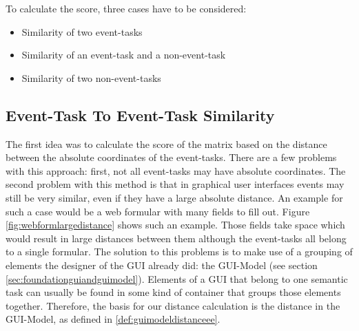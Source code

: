 To calculate the score, three cases have to be considered:
\begin{itemize}
	\item Similarity of two event-tasks
	\item Similarity of an event-task and a non-event-task
	\item Similarity of two non-event-tasks
\end{itemize}

\subsection{Event-Task To Event-Task Similarity}
The first idea was to calculate the score of the matrix based on the distance between the absolute coordinates of the event-tasks.
There are a few problems with this approach: first, not all event-tasks may have absolute coordinates.
The second problem with this method is that in graphical user interfaces events may still be very similar, even if they have a large absolute distance.
An example for such a case would be a web formular with many fields to fill out. Figure \ref{fig:webformlargedistance} shows such an example.
Those fields take space which would result in large distances between them although the event-tasks all belong to a single formular.
The solution to this problems is to make use of a grouping of elements the designer of the GUI already did: the GUI-Model (see section \ref{sec:foundationguiandguimodel}).
Elements of a GUI that belong to one semantic task can usually be found in some kind of container that groups those elements together.
Therefore, the basis for our distance calculation is the distance in the GUI-Model, as defined in \ref{def:guimodeldistanceee}.

